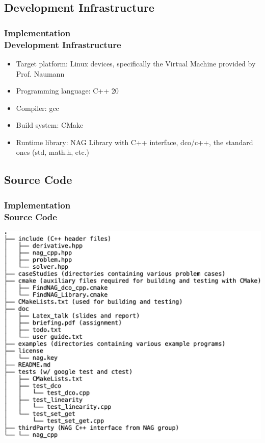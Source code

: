 \documentclass[ucs,10pt]{beamer}
\begin{document}
\subsection{Development Infrastructure}
\begin{frame}
\frametitle{Implementation \\
\small \color{rwth-blue} Development Infrastructure}
\begin{itemize}
	\item Target platform: Linux devices, specifically the Virtual Machine provided by Prof. Naumann
	\item Programming language: C++ 20
	\item Compiler: gcc
	\item Build system: CMake
	\item Runtime library: NAG Library with C++ interface, dco/c++, the standard ones (std, math.h, etc.)
\end{itemize}
\end{frame}

\subsection{Source Code}

\begin{frame}
\frametitle{Implementation \\
\small \color{rwth-blue} Source Code}
\vspace{1em}
\includegraphics[height=\textheight]{tree.png}
\end{frame}
\end{document}
